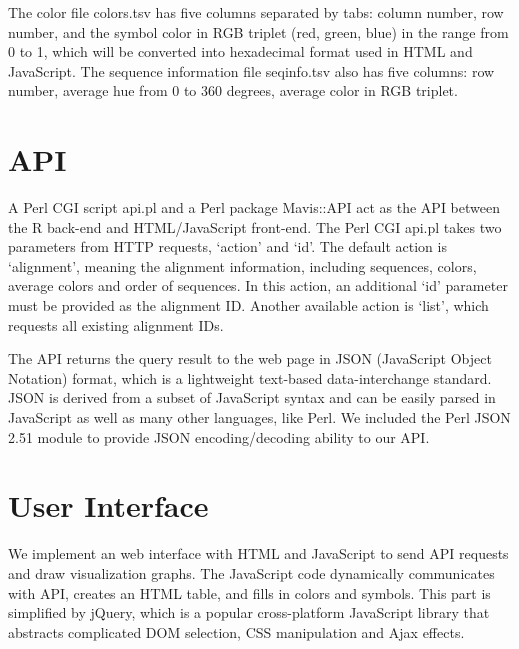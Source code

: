 The color file colors.tsv has five columns separated by tabs: column number, row number, and the symbol color in RGB triplet (red, green, blue) in the range from 0 to 1, which will be converted into hexadecimal format used in HTML and JavaScript. The sequence information file seqinfo.tsv also has five columns: row number, average hue from 0 to 360 degrees, average color in RGB triplet.

\section{API}

A Perl CGI script api.pl and a Perl package Mavis::API act as the API between the R back-end and HTML/JavaScript front-end. The Perl CGI api.pl takes two parameters from HTTP requests, ‘action’ and ‘id’. The default action is ‘alignment’, meaning the alignment information, including sequences, colors, average colors and order of sequences. In this action, an additional ‘id’ parameter must be provided as the alignment ID. Another available action is ‘list’, which requests all existing alignment IDs.

The API returns the query result to the web page in JSON (JavaScript Object Notation) format, which is a lightweight text-based data-interchange standard. JSON is derived from a subset of JavaScript syntax and can be easily parsed in JavaScript as well as many other languages, like Perl. We included the Perl JSON 2.51 module to provide JSON encoding/decoding ability to our API.

\section{User Interface}

We implement an web interface with HTML and JavaScript to send API requests and draw visualization graphs. The JavaScript code dynamically communicates with API, creates an HTML table, and fills in colors and symbols. This part is simplified by jQuery, which is a popular cross-platform JavaScript library that abstracts complicated DOM selection, CSS manipulation and Ajax effects.
